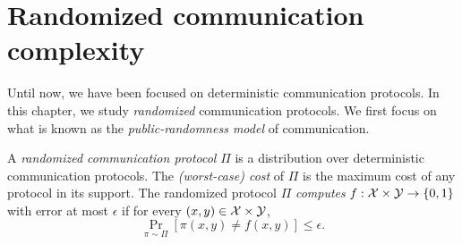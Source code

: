 







% 

\chapter[Randomized complexity]{Randomized communication complexity}
Until now, we have been focused on deterministic communication protocols. In this chapter, we study \emph{randomized} communication protocols. We first focus on what is known as the \emph{public-randomness model} of communication. 

\begin{definition}
A \emph{randomized communication protocol} $\Pi$ is a distribution over deterministic communication protocols. The \emph{(worst-case) cost} of $\Pi$ is the maximum cost of any protocol in its support. The randomized protocol $\Pi$ \emph{computes} $f : \mathcal{X} \times \mathcal{Y} \to \{0,1\}$ with error at most $\epsilon$ if for every $(x,y) \in \mathcal{X} \times \mathcal{Y}$,
\[
\Pr_{\pi \sim \Pi}[ \pi(x,y) \neq f(x,y) ] \le \epsilon.
\]
\end{definition}


